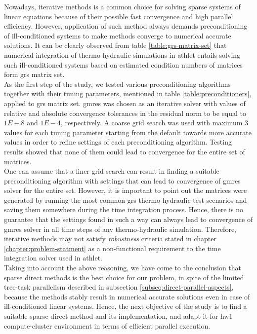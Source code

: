 \label{subseq:hybrid-method-description}

Nowadays, iterative methods is a common choice for solving sparse systems of linear equations because of their possible fast convergence and high parallel efficiency. However, application of such method always demands preconditioning of ill-conditioned systems to make methods converge to numerical accurate solutions. It can be clearly observed from table \ref{table:grs-matrix-set} that numerical integration of thermo-hydraulic simulations in \gls{athlet} entails solving such ill-conditioned systems  based on estimated condition numbers of matrices form \gls{grs} matrix set.\\


As the first step of the study, we tested various preconditioning algorithms together with their tuning parameters, mentioned in table \ref{table:preconditioners}, applied to \gls{grs} matrix set. \gls{gmres} was chosen as an iterative solver with values of relative and absolute convergence tolerances in the residual norm to be equal to $1E-8$ and $1E-4$, respectively. A coarse grid search was used with maximum 3 values for each tuning parameter starting from the default towards more accurate values in order to refine settings of each preconditioning algorithm. Testing results showed that none of them could lead to convergence for the entire set of matrices.\\


One can assume that a finer grid search can result in finding a suitable preconditioning algorithm with settings that can lead to convergence of \gls{gmres} solver for the entire set. However, it is important to point out the matrices were generated by running the most common \gls{grs} thermo-hydraulic test-scenarios and saving them somewhere during the time integration process. Hence, there is no guarantee that the settings found in such a way can always lead to convergence of \gls{gmres} solver in all time steps of any thermo-hydraulic simulation. Therefore, iterative methods may not satisfy \textit{robustness} criteria stated in chapter \ref{chapter:problem-statment} as a non-functional requirement to the time integration solver used in \gls{athlet}.\\


Taking into account the above reasoning, we have come to the conclusion that sparse direct methods is the best choice for our problem, in spite of the limited tree-task parallelism described in subsection \ref{subseq:direct-parallel-aspects}, because the methods stably result in numerical accurate solutions even in case of ill-conditioned linear systems. Hence, the next objective of the study is to find a suitable sparse direct method and its implementation, and adapt it for \gls{hw1} compute-cluster environment in terms of efficient parallel execution. \\

